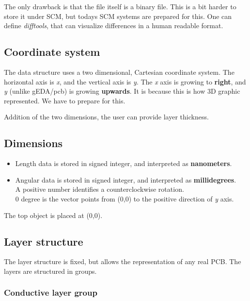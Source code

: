 \documentclass[12pt]{article}
\begin{document}
The only drawback is that the file itself is a binary file. This is a bit
harder to store it under SCM, but todays SCM systems are prepared for this.
One can define \textit{difftools}, that can visualize differences in a human
readable format.

\subsection{Coordinate system}\label{coordinate-system}

The data structure uses a two dimensional, Cartesian coordinate system.
The horizontal axis is \emph{x}, and the vertical axis is \emph{y}. The
\emph{x} axis is growing to \textbf{right}, and \emph{y} (unlike
gEDA/pcb) is growing \textbf{upwards}. It is because this is how 3D
graphic represented. We have to prepare for this.

Addition of the two dimensions, the user can provide layer thickness.

\subsection{Dimensions}\label{dimensions}

\begin{itemize}
\item
  Length data is stored in signed integer, and interpreted as
\textbf{nanometers}.
\item
  Angular data is stored in signed integer, and interpreted as
\textbf{millidegrees}.\\
  A positive number identifies a counterclockwise rotation.\\
  0 degree is the vector points from (0,0) to the positive direction of
\emph{y} axis.
\end{itemize}

The top object is placed at (0,0).

\subsection{Layer structure}\label{layer-structure}

The layer structure is fixed, but allows the representation of any real
PCB. The layers are structured in groups.

\subsubsection{Conductive layer group}\label{conductive-layer-group}
\end{document}
